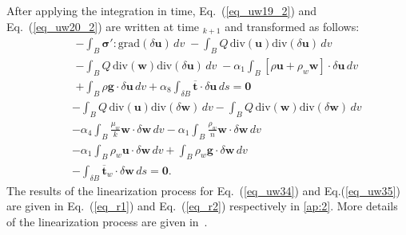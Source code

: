 \documentclass[preprint,12pt,a4paper]{elsarticle}
\begin{document}
After applying the integration in time,  Eq.~(\ref{eq_uw19_2}) and Eq.~(\ref{eq_uw20_2}) are written at time $_{k+1}$ and transformed as follows:
\begin{eqnarray} \label{eq_uw34}
&&-\int_B \boldsymbol{ \sigma'}:\mbox{grad}(\delta\boldsymbol{u}) \, dv \; -\int_B  Q \, \mbox{div}(\boldsymbol{u}) \mbox{div}(\delta\boldsymbol{u}) \, dv  \nonumber \\ 
&& -\int_B  Q \, \mbox{div}(\boldsymbol{w}) \mbox{div}(\delta\boldsymbol{u}) \, dv \;  - \alpha_1 \int_B \left[\rho\boldsymbol{u}+\rho_w \boldsymbol{w}\right]\cdot\delta\boldsymbol{u} \, dv 
\nonumber \\
&&+ \int_B \rho\boldsymbol{g}\cdot\delta\boldsymbol{u} \, dv+ \alpha_8 \int_{\delta B} \boldsymbol{\overline{t}}\cdot\delta\boldsymbol{u} \, ds=\boldsymbol{0}
\end{eqnarray}
\begin{eqnarray} \label{eq_uw35}
&&-\int_B Q \, \mbox{div}(\boldsymbol{u}) \mbox{div}(\delta \boldsymbol{w}) \, dv  -\int_B Q \, \mbox{div}(\boldsymbol{w}) \mbox{div}(\delta \boldsymbol{w}) \, dv 
\nonumber\\
&&- \alpha_4\int_B\frac{\mu_w}{k}\boldsymbol{w} \cdot \delta \boldsymbol{w} \, dv 
-\alpha_1 \int_B \frac{\rho_w}{n}\boldsymbol{w}\cdot \delta \boldsymbol{w} \, dv
\nonumber\\
&&-\alpha_1\int_B \rho_w\boldsymbol{u} \cdot \delta \boldsymbol{w} \, dv+\int_B \rho_w\boldsymbol{g} \cdot \delta \boldsymbol{w} \, dv 
\nonumber\\
&&-\int_{\delta B}\boldsymbol{\overline{t}}_w\cdot\delta\boldsymbol{w} \, ds =\boldsymbol{0}.
\end{eqnarray}
The results of the linearization process for  Eq.~(\ref{eq_uw34}) and Eq.(\ref{eq_uw35}) are given in Eq.~(\ref{eq_r1}) and Eq.~(\ref{eq_r2}) respectively in \ref{ap:2}. More details of the linearization process are given in~\cite{Navas:17c}.

\end{document}
